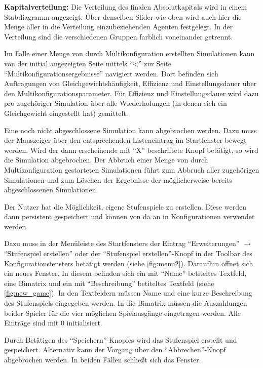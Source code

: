 \documentclass[parskip=full,11pt]{scrartcl}
\begin{document}
\textbf{Kapitalverteilung:}
Die Verteilung des finalen Absolutkapitals wird in einem Stabdiagramm angezeigt. Über denselben Slider wie oben wird auch hier die Menge aller in die Verteilung einzubeziehenden Agenten festgelegt. In der Verteilung sind die verschiedenen Gruppen farblich voneinander getrennt.

Im Falle einer Menge von durch Multikonfiguration erstellten Simulationen kann von der initial angezeigten Seite mittels \enquote{<} zur Seite \enquote{Multikonfigurationsergebnisse} navigiert werden. Dort befinden sich Auftragungen von Gleichgewichtshäufigkeit, \Gls{Effizienz} und \Gls{Einstellungsdauer} über den Multikonfigurationsparameter. Für \Gls{Effizienz} und \Gls{Einstellungsdauer} wird dazu pro zugehöriger Simulation über alle Wiederholungen (in denen sich ein Gleichgewicht eingestellt hat) gemittelt.

Eine noch nicht abgeschlossene Simulation kann abgebrochen werden. Dazu muss der Mauszeiger über den entsprechenden Listeneintrag im Startfenster bewegt werden. Wird der dann erscheinende mit \enquote{X} beschriftete Knopf betätigt, so wird die Simulation abgebrochen. Der Abbruch einer Menge von durch Multikonfiguration gestarteten Simulationen führt zum Abbruch aller zugehörigen Simulationen und zum Löschen der Ergebnisse der möglicherweise bereits abgeschlossenen Simulationen.

Der \Gls{Nutzer} hat die Möglichkeit, eigene Stufenspiele zu erstellen. Diese werden dann persistent gespeichert und können von da an in Konfigurationen verwendet werden.

Dazu muss in der Menüleiste des Startfensters der Eintrag \enquote{Erweiterungen} \(\rightarrow\) \enquote{Stufenspiel erstellen} oder der \enquote{Stufenspiel erstellen}-Knopf in der Toolbar des Konfigurationsfensters betätigt werden (siehe \cref{fig:menu2}). Daraufhin öffnet sich ein neues Fenster. In diesem befinden sich ein mit \enquote{Name} betiteltes Textfeld, eine Bimatrix und ein mit \enquote{Beschreibung} betiteltes Textfeld (siehe \cref{fig:new_game}). In den Textfeldern müssen Name und eine kurze Beschreibung des Stufenspiels eingegeben werden. In die Bimatrix müssen die Auszahlungen beider Spieler für die vier möglichen Spielausgänge eingetragen werden. Alle Einträge sind mit \(0\) initialisiert.

Durch Betätigen des \enquote{Speichern}-Knopfes wird das Stufenspiel erstellt und gespeichert. Alternativ kann der Vorgang über den \enquote{Abbrechen}-Knopf abgebrochen werden. In beiden Fällen schließt sich das Fenster.
\end{document}
